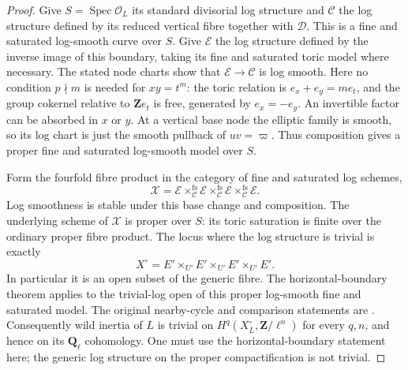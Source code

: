 \begin{proof}
Give $S=\operatorname{Spec}\mathcal O_L$ its standard divisorial log
 structure and $\mathcal C$ the log structure defined by its reduced
 vertical fibre together with $\mathcal D$.  This is a fine and
 saturated log-smooth curve over $S$.  Give $\mathcal E$ the log
 structure defined by the inverse image of this boundary, taking
 its fine and saturated toric model where necessary.  The stated
 node charts show that $\mathcal E\to\mathcal C$ is log smooth.
Here no condition $p\nmid m$ is needed for $xy=t^m$: the toric
 relation is $e_x+e_y=m e_t$, and the group cokernel relative to
 $\mathbf Z e_t$ is free, generated by $e_x=-e_y$.
An invertible factor can be absorbed in $x$ or $y$.  At a vertical
 base node the elliptic family is smooth, so its log chart is just
 the smooth pullback of $uv=\varpi$.  Thus composition gives a
 proper fine and saturated log-smooth model over $S$.

Form the fourfold fibre product in the category of fine and
 saturated log schemes,
\[
 \mathcal X=\mathcal E\mathbin{\times^{\mathrm{fs}}_{\mathcal C}}
 \mathcal E\mathbin{\times^{\mathrm{fs}}_{\mathcal C}}
 \mathcal E\mathbin{\times^{\mathrm{fs}}_{\mathcal C}}\mathcal E.
\]
Log smoothness is stable under this base change and composition.
The underlying scheme of $\mathcal X$ is proper over $S$: its
 toric saturation is finite over the ordinary proper fibre product.
The locus where the log structure is trivial is exactly
\[
 X^\circ=E'\times_{U'}E'\times_{U'}E'\times_{U'}E'.
\]
In particular it is an open subset of the generic fibre. The
 horizontal-boundary theorem \cite[Corollary~8.4.3, p.~310]{Illusie}
 applies to the trivial-log open of this proper log-smooth fine and
 saturated model. The original nearby-cycle and comparison statements are
 \cite[Variant~3.4.1, Proposition~4.2 and Remark~4.2.1]{Nakayama}.
Consequently wild inertia of $L$ is trivial on
 $H^q(X^\circ_{\overline L},\mathbf Z/\ell^n)$ for every $q,n$,
 and hence on its $\mathbf Q_\ell$ cohomology.  One must use the
 horizontal-boundary statement here; the generic log structure on
 the proper compactification is not trivial.


\end{proof}
